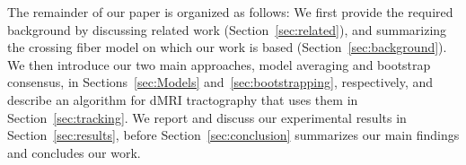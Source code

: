 


The remainder of our paper is organized as follows: We first provide the required background by discussing related work (Section~\ref{sec:related}), and summarizing the crossing fiber model on which our work is based (Section~\ref{sec:background}). We then introduce our two main approaches, model averaging and bootstrap consensus, in Sections~\ref{sec:Models} and~\ref{sec:bootstrapping}, respectively, and describe an algorithm for dMRI tractography that uses them in Section~\ref{sec:tracking}. We report and discuss our experimental results in Section~\ref{sec:results}, before Section~\ref{sec:conclusion} summarizes our main findings and concludes our work.


